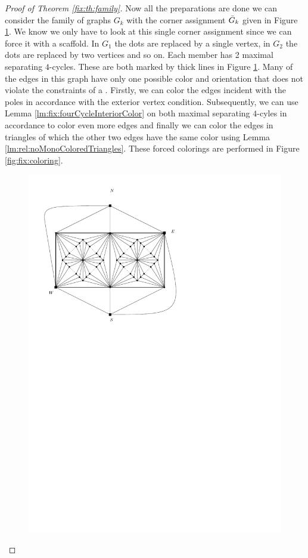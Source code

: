 \begin{proof}[Proof of Theorem \ref{fix:th:family}]
  Now all the preparations are done we can consider the family of graphs $G_k$ with the corner assignment $\bar{G}_k$ given in Figure \ref{fig:fix:manymany0}. We know we only have to look at this single corner assignment since we can force it with a scaffold. In $G_1$ the dots are replaced by a single vertex, in $G_2$ the dots are replaced by two vertices and so on. Each member has 2 maximal separating $4$-cycles. These are both marked by thick lines in Figure \ref{fig:fix:manymany0}.
  Many of the edges in this graph have only one possible color and orientation that does not violate the constraints of a \rel. Firstly, we can color the edges incident with the poles in accordance with the exterior vertex condition. Subsequently, we can use Lemma \ref{lm:fix:fourCycleInteriorColor} on both maximal separating $4$-cyles in accordance to color even more edges and finally we can color the edges in triangles of which the other two edges have  the same color using Lemma \ref{lm:rel:noMonoColoredTriangles}. These forced colorings are performed in Figure \ref{fig:fix:coloring}.

  \begin{figure}[h]
    \centering
    \includegraphics[scale=1]{fixExtension/img/manymanybase}
    \caption{}
    \label{fig:fix:manymany0}
  \end{figure}





\end{proof}

